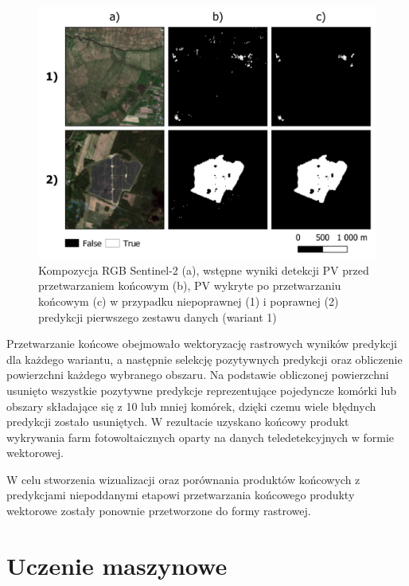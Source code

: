 \documentclass{amuthesis}
\begin{document}
\begin{figure}[t]

{\centering \includegraphics[width=1\textwidth,height=\textheight]{figures/postprocessing.png}

}

\caption{\label{fig-rycina-post-processing}Kompozycja RGB Sentinel-2
(a), wstępne wyniki detekcji PV przed przetwarzaniem końcowym (b), PV
wykryte po przetwarzaniu końcowym (c) w przypadku niepoprawnej (1) i
poprawnej (2) predykcji pierwszego zestawu danych (wariant 1)}

\end{figure}

Przetwarzanie końcowe obejmowało wektoryzację rastrowych wyników
predykcji dla każdego wariantu, a następnie selekcję pozytywnych
predykcji oraz obliczenie powierzchni każdego wybranego obszaru. Na
podstawie obliczonej powierzchni usunięto wszystkie pozytywne predykcje
reprezentujące pojedyncze komórki lub obszary składające się z 10 lub
mniej komórek, dzięki czemu wiele błędnych predykcji zostało usuniętych.
W rezultacie uzyskano końcowy produkt wykrywania farm fotowoltaicznych
oparty na danych teledetekcyjnych w formie wektorowej.

W celu stworzenia wizualizacji oraz porównania produktów końcowych z
predykcjami niepoddanymi etapowi przetwarzania końcowego produkty
wektorowe zostały ponownie przetworzone do formy rastrowej.

\hypertarget{sec-machine-learning}{%
\section{Uczenie maszynowe}\label{sec-machine-learning}}
\end{document}
